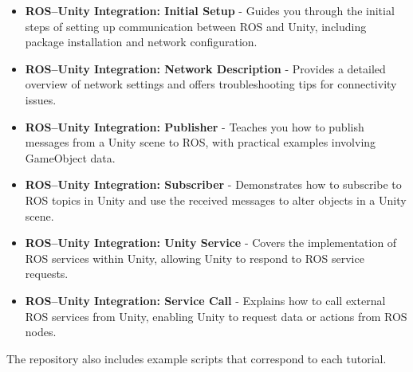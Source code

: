     \begin{itemize}
        \item \textbf{ROS–Unity Integration: Initial Setup} - Guides you through the initial steps of setting up communication between ROS and Unity, including package installation and network configuration.
        
        \item \textbf{ROS–Unity Integration: Network Description} - Provides a detailed overview of network settings and offers troubleshooting tips for connectivity issues.
        
        \item \textbf{ROS–Unity Integration: Publisher} - Teaches you how to publish messages from a Unity scene to ROS, with practical examples involving GameObject data.
        
        \item \textbf{ROS–Unity Integration: Subscriber} - Demonstrates how to subscribe to ROS topics in Unity and use the received messages to alter objects in a Unity scene.
        
        \item \textbf{ROS–Unity Integration: Unity Service} - Covers the implementation of ROS services within Unity, allowing Unity to respond to ROS service requests.
        
        \item \textbf{ROS–Unity Integration: Service Call} - Explains how to call external ROS services from Unity, enabling Unity to request data or actions from ROS nodes.
    \end{itemize}
    
    The repository also includes example scripts that correspond to each tutorial.
    
